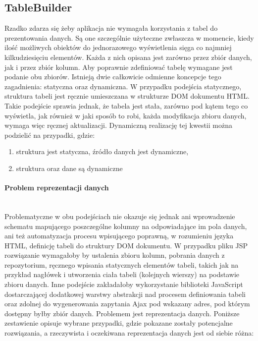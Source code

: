 	
\subsection{TableBuilder}
	Rzadko zdarza się żeby aplikacja nie wymagała korzystania z tabel do prezentowania danych. Są one szczególnie użyteczne zwłaszcza w momencie, kiedy ilość możliwych obiektów do jednorazowego wyświetlenia sięga co najmniej kilkudziesięciu elementów. Każda z nich opisana jest zarówno przez zbiór danych, jak i przez zbiór kolumn. Aby poprawnie zdefiniować tabelę wymagane jest podanie obu zbiorów. Istnieją dwie całkowicie odmienne koncepcje tego zagadnienia: statyczna oraz dynamiczna. W przypadku podejścia statycznego, struktura tabeli jest ręcznie umieszczana w strukturze DOM dokumentu HTML. Takie podejście sprawia jednak, że tabela jest stała, zarówno pod kątem tego co wyświetla, jak również w jaki sposób to robi, każda modyfikacja zbioru danych, wymaga więc ręcznej aktualizacji. Dynamiczną realizację tej kwestii można podzielić na przypadki, gdzie:
	\begin{enumerate}
		\item struktura jest statyczna, źródło danych jest dynamiczne,
		\item struktura oraz dane są dynamiczne
	\end{enumerate}
	
	\paragraph{Problem reprezentacji danych} \hspace{0pt} \\
	Problematyczne w obu podejściach nie okazuje się jednak ani wprowadzenie schematu mapującego poszczególne kolumny na odpowiadające im pola danych, ani też automatyzacja procesu wpisującego poprawną, w rozumieniu języka HTML, definicję tabeli do struktury DOM dokumentu. W przypadku pliku JSP rozwiązanie wymagałoby by ustalenia zbioru kolumn, pobrania danych z repozytorium, ręcznego wpisania statycznych elementów tabeli, takich jak na przykład nagłówek i utworzenia ciała tabeli (kolejnych wierszy) na podstawie zbioru danych. Inne podejście zakładałoby wykorzystanie biblioteki JavaScript dostarczającej dodatkowej warstwy abstrakcji nad procesem definiowania tabeli oraz zdolnej do wygenerowania zapytania Ajax pod wskazany adres, pod którym dostępny byłby zbiór danych. Problemem jest reprezentacja danych. Poniższe zestawienie opisuje wybrane przypadki, gdzie pokazane zostały potencjalne rozwiązania, a rzeczywista i oczekiwana reprezentacja danych jest od siebie różna:
	
